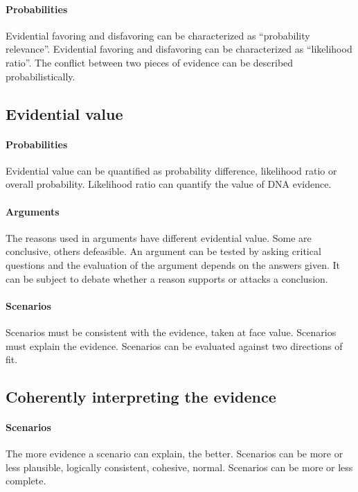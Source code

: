 \documentclass[10pt]{article}
\begin{document}
\paragraph{Probabilities}
	Evidential favoring and disfavoring can be characterized as ``probability relevance''.
	Evidential favoring and disfavoring can be characterized as ``likelihood ratio''.
	The conflict between two pieces of evidence can be described probabilistically.

\subsection{Evidential value}

\paragraph{Probabilities}
	Evidential value can be quantified as probability difference, likelihood ratio or overall probability.
	Likelihood ratio can quantify the value of DNA evidence.
	
\paragraph{Arguments}
	The reasons used in arguments have different evidential value. Some are conclusive, others defeasible.
	An argument can be tested by asking critical questions and the evaluation of the argument depends on the answers given.
	It can be subject to debate whether a reason supports or attacks a conclusion.
	
\paragraph{Scenarios}
	Scenarios must be consistent with the evidence, taken at face value.
	Scenarios must explain the evidence.
	Scenarios can be evaluated against two directions of fit.
	
\subsection{Coherently interpreting the evidence}

\paragraph{Scenarios}
	The more evidence a scenario can explain, the better.
	Scenarios can be more or less plausible, logically consistent, cohesive, normal.
	Scenarios can be more or less complete.
	
\end{document}
